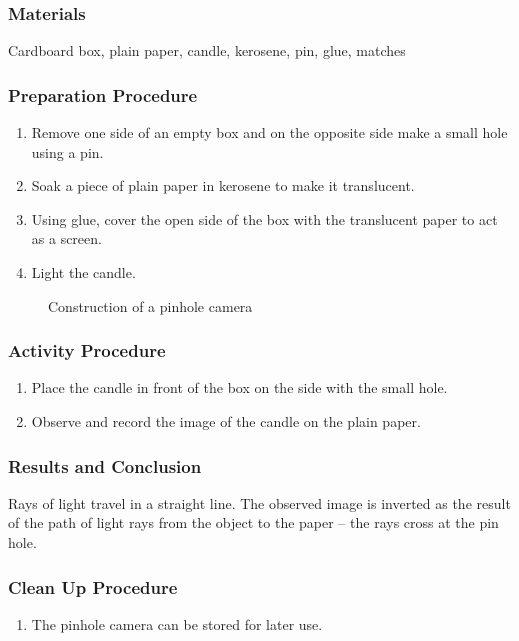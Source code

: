 \subsubsection*{Materials}
Cardboard box, plain paper, candle, kerosene, pin, glue, matches


\subsubsection*{Preparation Procedure}
\begin{enumerate}
\item{Remove one side of an empty box and on the opposite side make a small hole using a pin.} 
\item{Soak a piece of plain paper in kerosene to make it translucent.} 
\item{Using glue, cover the open side of the box with the translucent paper to act as a screen.} 
\item{Light the candle.} 
\end{enumerate}

\begin{figure}
\begin{center}
\def\svgwidth{250pt}

\caption{Construction of a pinhole camera}
\label{fig:pinhole-camera}
\end{center}
\end{figure}

\subsubsection*{Activity Procedure}
\begin{enumerate}
\item{Place the candle in front of the box on the side with the small hole.} 
\item{Observe and record the image of the candle on the plain paper.} 
\end{enumerate}

\subsubsection*{Results and Conclusion}
Rays of light travel in a straight line. The observed image is inverted as the result of the path of light rays from the object to the paper -- the rays cross at the pin hole.

\subsubsection*{Clean Up Procedure}
\begin{enumerate}
\item{The pinhole camera can be stored for later use.} 
\end{enumerate}

